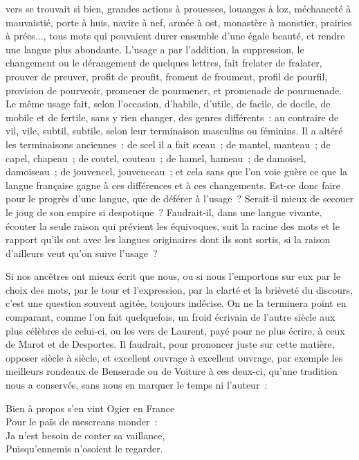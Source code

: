 \documentclass[french,twoside]{book} %
\begin{document}
vers se trouvait si bien, grandes actions à prouesses, louanges à loz, méchanceté à mauvaistié, porte à huis, navire à nef, armée à ost, monastère à monstier, prairies à prées..., tous mots qui pouvaient durer ensemble d’une égale beauté, et rendre une langue plus abondante. L'usage a par l’addition, la suppression, le changement ou le dérangement de quelques lettres, fait frelater de fralater, prouver de preuver, profit de proufit, froment de froument, profil de pourfil, provision de pourveoir, promener de pourmener, et promenade de pourmenade. Le même usage fait, selon l’occasion, d’habile, d’utile, de facile, de docile, de mobile et de fertile, sans y rien changer, des genres différents : au contraire de vil, vile, subtil, subtile, selon leur terminaison masculins ou féminins. Il a altéré les terminaisons anciennes : de scel il a fait sceau ; de mantel, manteau ; de capel, chapeau ; de coutel, couteau ; de hamel, hameau ; de damoisel, damoiseau ; de jouvencel, jouvenceau ; et cela sans que l’on voie guère ce que la langue française gagne à ces différences et à ces changements. Est-ce donc faire pour le progrès d’une langue, que de déférer à l’usage ? Serait-il mieux de secouer le joug de son empire si despotique ? Faudrait-il, dans une langue vivante, écouter la seule raison qui prévient les équivoques, suit la racine des mots et le rapport qu’ils ont avec les langues originaires dont ils sont sortis, si la raison d’ailleurs veut qu’on suive l’usage ?\par
Si nos ancêtres ont mieux écrit que nous, ou si nous l’emportons sur eux par le choix des mots, par le tour et l’expression, par la clarté et la brièveté du discours, c’est une question souvent agitée, toujours indécise. On ne la terminera point en comparant, comme l’on fait quelquefois, un froid écrivain de l’autre siècle aux plus célèbres de celui-ci, ou les vers de Laurent, payé pour ne plus écrire, à ceux de Marot et de Desportes. Il faudrait, pour prononcer juste sur cette matière, opposer siècle à siècle, et excellent ouvrage à excellent ouvrage, par exemple les meilleurs rondeaux de Benserade ou de Voiture à ces deux-ci, qu’une tradition nous a conservés, sans nous en marquer le temps ni l’auteur :\par
Bien à propos s’en vint Ogier en France \\
Pour le païs de mescreans monder : \\
Ja n’est besoin de conter sa vaillance, \\
Puisqu’ennemis n’osoient le regarder. \\
\end{document}
